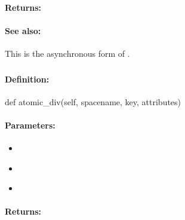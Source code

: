 \paragraph{Returns:}


\paragraph{See also:}  This is the asynchronous form of .

\pagebreak
\subsubsection{}
\label{api:python:atomic_div}


\paragraph{Definition:}
\begin{pythoncode}
def atomic_div(self, spacename, key, attributes)
\end{pythoncode}

\paragraph{Parameters:}
\begin{itemize}[noitemsep]
\item {}\\

\item {}\\

\item {}\\

\end{itemize}

\paragraph{Returns:}


\pagebreak
\subsubsection{}
\label{api:python:async_atomic_div}


